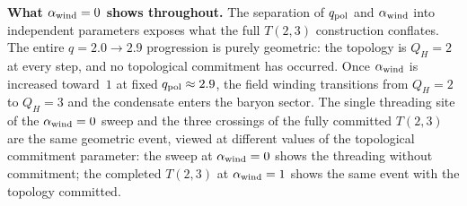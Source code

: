 \documentclass[11pt,a4paper]{article}
\theoremstyle{definition}\newtheorem{definition}[theorem]{Definition}
\theoremstyle{remark}
\newcommand{\QH}{Q_H}
\begin{document}
\textbf{What $\alpha_{\rm wind}=0$ shows throughout.}  The separation
of $q_{\rm pol}$ and $\alpha_{\rm wind}$ into independent parameters
exposes what the full $T(2,3)$ construction conflates.  The entire
$q=2.0\to2.9$ progression is purely geometric: the topology is $\QH=2$
at every step, and no topological commitment has occurred.
Once $\alpha_{\rm wind}$ is increased toward~$1$ at fixed
$q_{\rm pol}\approx2.9$, the field winding transitions from $\QH=2$ to
$\QH=3$ and the condensate enters the baryon sector.  The single
threading site of the $\alpha_{\rm wind}=0$ sweep and the three
crossings of the fully committed $T(2,3)$ are the same geometric
event, viewed at different values of the topological commitment
parameter: the sweep at $\alpha_{\rm wind}=0$ shows the threading
without commitment; the completed $T(2,3)$ at
$\alpha_{\rm wind}=1$ shows the same event with the topology
committed.
\end{document}
